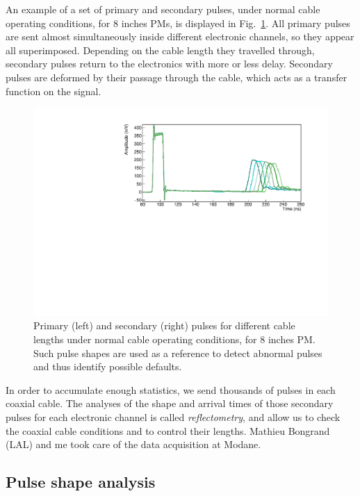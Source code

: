 An example of a set of primary and secondary pulses, under normal cable operating conditions, for $8$ inches PMs, is displayed in Fig.~\ref{fig:total_waveform}.
All primary pulses are sent almost simultaneously inside different electronic channels, so they appear all superimposed.
Depending on the cable length they travelled through, secondary pulses return to the electronics with more or less delay.
Secondary pulses are deformed by their passage through the cable, which acts as a transfer function on the signal.
\begin{figure}[h!]
  \centering
  \includegraphics[width=1\textwidth]{commissioning/fig_commissioning/pulses_example.pdf}
  \caption{Primary (left) and secondary (right) pulses for different cable lengths under normal cable operating conditions, for $8$ inches PM.
    Such pulse shapes are used as a reference to detect abnormal pulses and thus identify possible defaults.
    \label{fig:total_waveform}}
\end{figure}

In order to accumulate enough statistics, we send thousands of pulses in each coaxial cable.
The analyses of the shape and arrival times of those secondary pulses for each electronic channel is called \emph{reflectometry}, and allow us to check the coaxial cable conditions and to control their lengths.
Mathieu Bongrand (LAL) and me took care of the data acquisition at Modane.



\subsection{Pulse shape analysis}
\label{subsec:pulse_shape}

